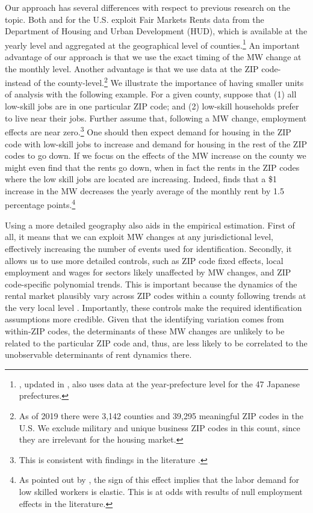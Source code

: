 Our approach has several differences with respect to previous research on the topic.
Both \textcite{Tidemann2018} and \textcite{Yamagishi2019} for the U.S. exploit Fair 
Markets Rents data from the Department of Housing and Urban Development (HUD), which is 
available at the yearly level and aggregated at the geographical level of 
counties.\footnote{\textcite{Yamagishi2019}, updated in \textcite{Yamagishi2021}, also 
	uses data at the year-prefecture level for the 47 Japanese prefectures.}
An important advantage of our approach is that we use the exact timing of the MW change 
at the monthly level.
Another advantage is that we use data at the ZIP code- instead of the 
county-level.\footnote{As of 2019 there were 3,142 counties and 39,295 meaningful ZIP 
	codes in the U.S. We exclude military and unique business ZIP codes in this count, 
	since they are irrelevant for the housing market.} 
We illustrate the importance of having smaller units of analysis with the following 
example.
For a given county, suppose that (1) all low-skill jobs are in one particular ZIP code; 
and (2) low-skill households prefer to live near their jobs. Further assume that, 
following a MW change, employment effects are near zero.\footnote{This is consistent with 
findings in the literature \parencite[for a comprehensive review see][]{Dube2019}.} 
One should then expect demand for housing in the ZIP code with low-skill jobs to increase 
and demand for housing in the rest of the ZIP codes to go down.
If we focus on the effects of the MW increase on the county we might even find that the 
rents go down, when in fact the rents in the ZIP codes where the low skill jobs are 
located are increasing.
Indeed, \textcite{Tidemann2018} finds that a \$1 increase in the MW decreases the yearly 
average of the monthly rent by 1.5 percentage points.\footnote{As pointed out by 
	\textcite{Tidemann2018}, the sign of this effect implies that the labor demand for 
	low skilled workers is elastic. This is at odds with results of null employment 
	effects in the literature.} 

Using a more detailed geography also aids in the empirical estimation.
First of all, it means that we can exploit MW changes at any jurisdictional level, 
effectively increasing the number of events used for identification.
Secondly, it allows us to use more detailed controls, such as ZIP code fixed effects, 
local employment and wages for sectors likely unaffected by MW changes, and ZIP 
code-specific polynomial trends.
This is important because the dynamics of the rental market plausibly vary across ZIP 
codes within a county following trends at the very local level 
\parencite{AlmagroDominguez2019}.
Importantly, these controls make the required identification assumptions more credible. 
Given that the identifying variation comes from within-ZIP codes, the determinants of 
these MW changes are unlikely to be related to the particular ZIP code and, thus, are 
less likely to be correlated to the unobservable determinants of rent dynamics there.

